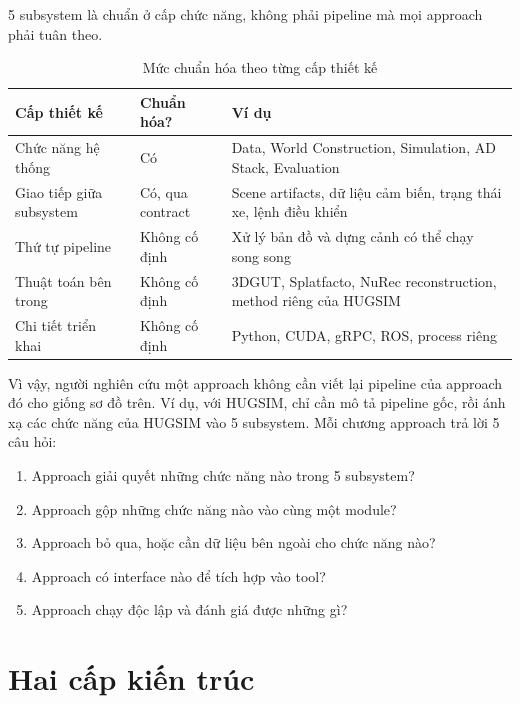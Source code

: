 5 subsystem là chuẩn ở cấp chức năng, không phải pipeline mà mọi approach phải tuân theo.

\begin{table}[H]
  \centering
  \caption{Mức chuẩn hóa theo từng cấp thiết kế}
  \begin{tabularx}{\linewidth}{>{\raggedright\arraybackslash}p{3.5cm} l >{\raggedright\arraybackslash}X}
    \toprule
    \textbf{Cấp thiết kế} & \textbf{Chuẩn hóa?} & \textbf{Ví dụ} \\
    \midrule
    Chức năng hệ thống & Có & Data, World Construction, Simulation, AD Stack, Evaluation \\
    \addlinespace
    Giao tiếp giữa subsystem & Có, qua contract & Scene artifacts, dữ liệu cảm biến, trạng thái xe, lệnh điều khiển \\
    \addlinespace
    Thứ tự pipeline & Không cố định & Xử lý bản đồ và dựng cảnh có thể chạy song song \\
    \addlinespace
    Thuật toán bên trong & Không cố định & 3DGUT, Splatfacto, NuRec reconstruction, method riêng của HUGSIM \\
    \addlinespace
    Chi tiết triển khai & Không cố định & Python, CUDA, gRPC, ROS, process riêng \\
    \bottomrule
  \end{tabularx}
\end{table}

Vì vậy, người nghiên cứu một approach không cần viết lại pipeline của approach đó cho giống sơ đồ trên.
Ví dụ, với HUGSIM, chỉ cần mô tả pipeline gốc, rồi ánh xạ các chức năng của HUGSIM vào 5 subsystem.
Mỗi chương approach trả lời 5 câu hỏi:
\begin{enumerate}
  \item Approach giải quyết những chức năng nào trong 5 subsystem?
  \item Approach gộp những chức năng nào vào cùng một module?
  \item Approach bỏ qua, hoặc cần dữ liệu bên ngoài cho chức năng nào?
  \item Approach có interface nào để tích hợp vào tool?
  \item Approach chạy độc lập và đánh giá được những gì?
\end{enumerate}

\section{Hai cấp kiến trúc}

